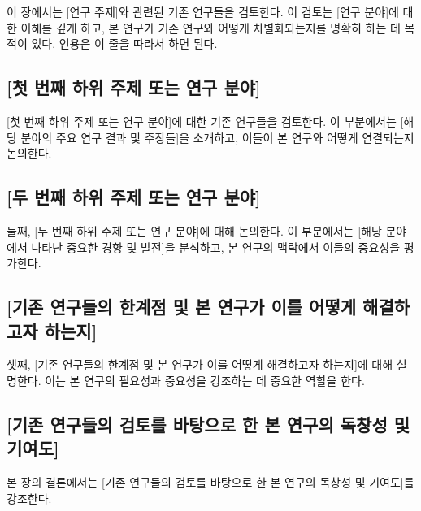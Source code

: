이 장에서는 [연구 주제]와 관련된 기존 연구들을 검토한다. 
이 검토는 [연구 분야]에 대한 이해를 깊게 하고, 본 연구가 기존 연구와 어떻게 차별화되는지를 명확히 하는 데 목적이 있다.
인용은 이 줄을 따라서 하면 된다.\cite{buterin2014next,wood2014ethereum}

\subsection{[첫 번째 하위 주제 또는 연구 분야]}
[첫 번째 하위 주제 또는 연구 분야]에 대한 기존 연구들을 검토한다. 
이 부분에서는 [해당 분야의 주요 연구 결과 및 주장들]을 소개하고, 이들이 본 연구와 어떻게 연결되는지 논의한다.

\subsection{[두 번째 하위 주제 또는 연구 분야]}
둘째, [두 번째 하위 주제 또는 연구 분야]에 대해 논의한다. 
이 부분에서는 [해당 분야에서 나타난 중요한 경향 및 발전]을 분석하고, 본 연구의 맥락에서 이들의 중요성을 평가한다.

\subsection{[기존 연구들의 한계점 및 본 연구가 이를 어떻게 해결하고자 하는지]}
셋째, [기존 연구들의 한계점 및 본 연구가 이를 어떻게 해결하고자 하는지]에 대해 설명한다. 
이는 본 연구의 필요성과 중요성을 강조하는 데 중요한 역할을 한다.

\subsection{[기존 연구들의 검토를 바탕으로 한 본 연구의 독창성 및 기여도]}
본 장의 결론에서는 [기존 연구들의 검토를 바탕으로 한 본 연구의 독창성 및 기여도]를 강조한다.